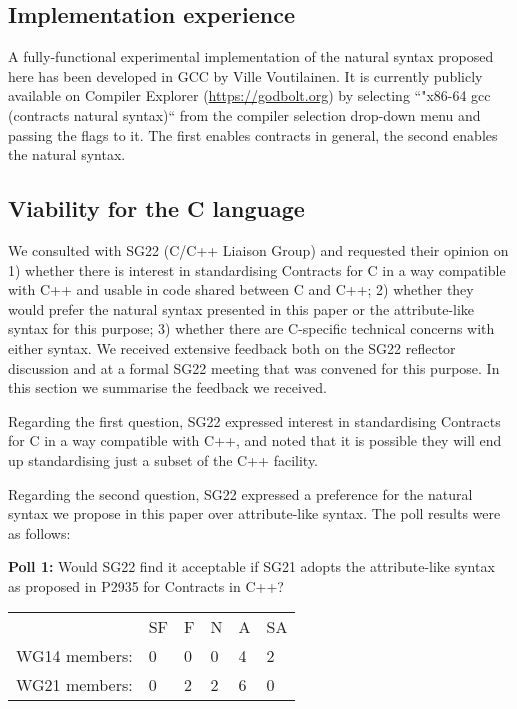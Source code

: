 
\subsection{Implementation experience}
\label{subsec:implxp}

A fully-functional experimental implementation of the natural syntax proposed here has been developed in GCC by Ville Voutilainen. It is currently publicly available on Compiler Explorer (\href{https://godbolt.org}{https://godbolt.org}) by selecting ``"x86-64 gcc (contracts natural syntax)`` from the compiler selection drop-down menu and passing the flags  to it. The first enables contracts in general, the second enables the natural syntax.


\subsection{Viability for the C language}
\label{subsec:clang}

We consulted with SG22 (C/C++ Liaison Group) and requested their opinion on 1) whether there is interest in standardising Contracts for C in a way compatible with C++ and usable in code shared between C and C++; 2) whether they would prefer the natural syntax presented in this paper or the attribute-like syntax \cite{P2935R3} for this purpose; 3) whether there are C-specific technical concerns with either syntax. We received extensive feedback both on the SG22 reflector discussion and at a formal SG22 meeting that was convened for this purpose. In this section we summarise the feedback we received.

Regarding the first question, SG22 expressed interest in standardising Contracts for C in a way compatible with C++, and noted that it is possible they will end up standardising just a subset of the C++ facility.

Regarding the second question, SG22 expressed a preference for the natural syntax we propose in this paper over attribute-like syntax. The poll results were as follows:

\begin{adjustwidth}{0.5cm}{0.5cm}
\textbf{Poll 1:} Would SG22 find it acceptable if SG21 adopts the attribute-like syntax as proposed in P2935 for Contracts in C++?

\begin{tabular}{l lllll}
 &SF & F & N & A & SA \\
WG14 members: & 0 & 0 & 0 & 4 & 2 \\
WG21 members: & 0 & 2 & 2 & 6 & 0
\end{tabular}
\end{adjustwidth}

